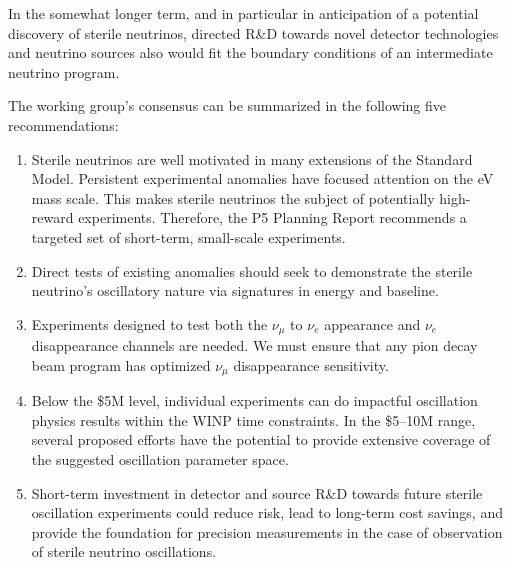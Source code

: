 In the somewhat longer term, and in particular in anticipation of a
potential discovery of sterile neutrinos, directed R\&D towards novel
detector technologies and neutrino sources also would fit the boundary
conditions of an intermediate neutrino program.

The working group's consensus can be summarized in the following five
recommendations:
\begin{enumerate}
\item{Sterile neutrinos are well motivated in many extensions of the
  Standard Model.  Persistent experimental anomalies have focused
  attention on the eV mass scale.  This makes sterile neutrinos the
  subject of potentially high-reward experiments.  Therefore, the P5
  Planning Report recommends a targeted set of short-term, small-scale
  experiments.}
\item{Direct tests of existing anomalies should seek to demonstrate
  the sterile neutrino's oscillatory nature via signatures in energy
  and baseline.}
\item{Experiments designed to test both the $\nu_{\mu}$ to $\nu_e$
  appearance and $\nu_e$ disappearance channels are needed.  We must
  ensure that any pion decay beam program has optimized $\nu_{\mu}$
  disappearance sensitivity.}
\item{Below the \$5M level, individual experiments can do impactful
  oscillation physics results within the WINP time constraints.  In
  the \$5--10M range, several proposed efforts have the potential to
  provide extensive coverage of the suggested oscillation parameter
  space.}
\item{Short-term investment in detector and source R\&D towards future
  sterile oscillation experiments could reduce risk, lead to long-term
  cost savings, and provide the foundation for precision measurements
  in the case of observation of sterile neutrino oscillations.}
\end{enumerate}
